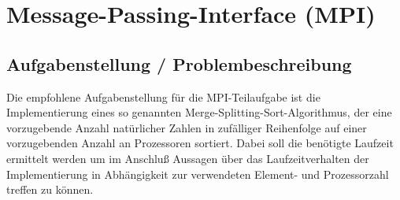 \documentclass[a4paper,12pt]{scrartcl}
\begin{document}



\section{Message-Passing-Interface (MPI)}

\subsection{Aufgabenstellung / Problembeschreibung}
Die empfohlene Aufgabenstellung f\"ur die MPI-Teilaufgabe ist die Implementierung eines so genannten Merge-Splitting-Sort-Algorithmus, der eine vorzugebende
Anzahl nat\"urlicher Zahlen in zuf\"alliger Reihenfolge auf einer vorzugebenden Anzahl an Prozessoren sortiert. Dabei soll die ben\"otigte Laufzeit ermittelt
werden um im Anschlu\ss{} Aussagen \"uber das Laufzeitverhalten der Implementierung in Abh\"angigkeit zur verwendeten Element- und Prozessorzahl treffen zu
k\"onnen.
\end{document}
